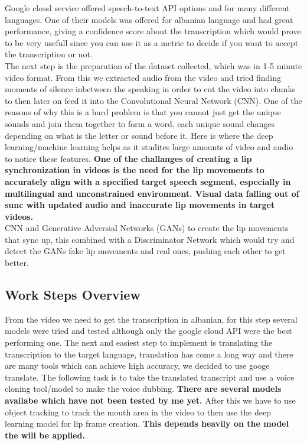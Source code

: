 \documentclass[12pt]{article}
\begin{document}
Google cloud service offered speech-to-text API options and for many different languages. One of their models was offered for albanian language and had great performance, giving a confidence score about the transcription which would prove to be very usefull since you can use it as a metric to decide if you want to accept the transcription or not. \\
The next step is the preparation of the dataset collected, which was in 1-5 minute video format. From this we extracted audio from the video and tried finding moments of silence inbetween the speaking in order to cut the video into chunks to then later on feed it into the Convolutional Neural Network (CNN).
One of the reasons of why this is a hard problem is that you cannot just get the unique sounds and join them together to form a word, each unique sound changes depending on what is the letter or sound before it. Here is where the deep learning/machine learning helps as it studites large amounts of video and audio to notice these features.
\textbf{One of the challanges of creating a lip synchronization in videos is the need for the lip movements to accurately align with a specified target speech segment, especially in multilingual and unconstrained environment. Visual data falling out of sunc with updated audio and inaccurate lip movements in target videos.}\\
CNN and Generative Adversial Networks (GANs) to create the lip movements that sync up, this combined with a Discriminator Network which would try and detect the GANs fake lip movements and real ones, pushing each other to get better.

\subsection{Work Steps Overview}

From the video we need to get the transcription in albanian, for this step several models were tried and tested although only the google cloud API were the best performing one. The next and easiest step to implement is translating the transcription to the target language, translation has come a long way and there are many tools which can achieve high accuracy, we decided to use googe translate. The following task is to take the translated transcript and use a voice cloning tool/model to make the voice dubbing. \textbf{There are several models availabe which have not been tested by me yet.} After this we have to use object tracking to track the mouth area in the video to then use the deep learning model for lip frame creation. \textbf{This depends heavily on the model the will be applied.}
\end{document}
